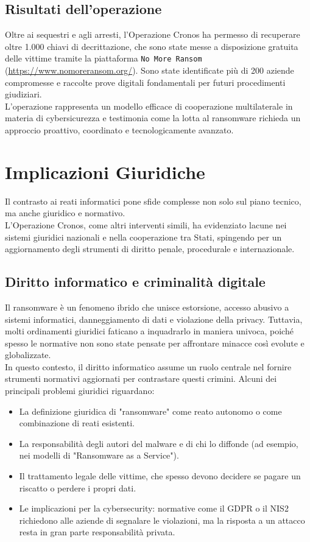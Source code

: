 \documentclass[a4paper,12pt,twoside]{article}
\begin{document}
\subsection{Risultati dell'operazione}
Oltre ai sequestri e agli arresti, l'Operazione Cronos ha permesso di recuperare oltre 1.000 chiavi di decrittazione, che sono state messe a disposizione gratuita delle vittime tramite la piattaforma \texttt{No More Ransom} (\url{https://www.nomoreransom.org/}). Sono state identificate più di 200 aziende compromesse e raccolte prove digitali fondamentali per futuri procedimenti giudiziari.\\
L'operazione rappresenta un modello efficace di cooperazione multilaterale in materia di cybersicurezza e testimonia come la lotta al ransomware richieda un approccio proattivo, coordinato e tecnologicamente avanzato.

\newpage
\section{Implicazioni Giuridiche}
Il contrasto ai reati informatici pone sfide complesse non solo sul piano tecnico, ma anche giuridico e normativo.\\
L'Operazione Cronos, come altri interventi simili, ha evidenziato lacune nei sistemi giuridici nazionali e nella cooperazione tra Stati, spingendo per un aggiornamento degli strumenti di diritto penale, procedurale e internazionale.

\subsection{Diritto informatico e criminalità digitale}
Il ransomware è un fenomeno ibrido che unisce estorsione, accesso abusivo a sistemi informatici, danneggiamento di dati e violazione della privacy. Tuttavia, molti ordinamenti giuridici faticano a inquadrarlo in maniera univoca, poiché spesso le normative non sono state pensate per affrontare minacce così evolute e globalizzate.\\
In questo contesto, il diritto informatico assume un ruolo centrale nel fornire strumenti normativi aggiornati per contrastare questi crimini. Alcuni dei principali problemi giuridici riguardano:

\begin{itemize}
    \item La definizione giuridica di "ransomware" come reato autonomo o come combinazione di reati esistenti.
    \item La responsabilità degli autori del malware e di chi lo diffonde (ad esempio, nei modelli di "Ransomware as a Service").
    \item Il trattamento legale delle vittime, che spesso devono decidere se pagare un riscatto o perdere i propri dati.
    \item Le implicazioni per la cybersecurity: normative come il GDPR o il NIS2 richiedono alle aziende di segnalare le violazioni, ma la risposta a un attacco resta in gran parte responsabilità privata.
\end{itemize}
\end{document}
